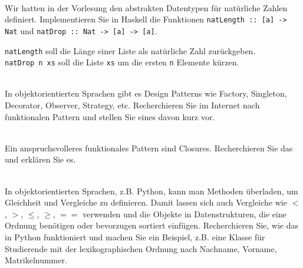 \\
Wir hatten in der Vorlesung den abstrakten Datentypen für natürliche Zahlen definiert.
Implementieren Sie in Haskell die Funktionen \texttt{natLength :: [a] -> Nat} und \texttt{natDrop :: Nat -> [a] -> [a]}.
\begin{notes}
  \texttt{natLength} soll die Länge einer Liste als natürliche Zahl zurückgeben. \\
  \texttt{natDrop n xs} soll die Liste \texttt{xs} um die ersten \texttt{n} Elemente kürzen.
\end{notes}

\\
In objektorientierten Sprachen gibt es Design Patterns wie Factory, Singleton, Decorator, Observer, Strategy, etc.
Recherchieren Sie im Internet nach funktionalen Pattern und stellen Sie eines davon kurz vor.

\\
Ein anspruchsvolleres funktionales Pattern sind Closures. Recherchieren Sie das und erklären Sie es.

\\
In objektorientierten Sprachen, z.B. Python, kann man Methoden überladen, um Gleichheit und Vergleiche zu definieren. Damit lassen sich auch Vergleiche wie $<$, $>$, $\leq$, $\geq$, $==$ verwenden und die Objekte in Datenstrukturen, die eine Ordnung benötigen oder bevorzugen sortiert einfügen.
Recherchieren Sie, wie das in Python funktioniert und machen Sie ein Beispiel, z.B. eine Klasse für Studierende mit der lexikographischen Ordnung nach Nachname, Vorname, Matrikelnummer.




